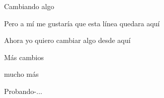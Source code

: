 \documentclass{article}
\begin{document}
Cambiando algo


Pero a mí me gustaría que esta línea quedara aquí

Ahora yo quiero cambiar algo desde aquí

Más cambios

mucho más

Probando-...
\end{document}
